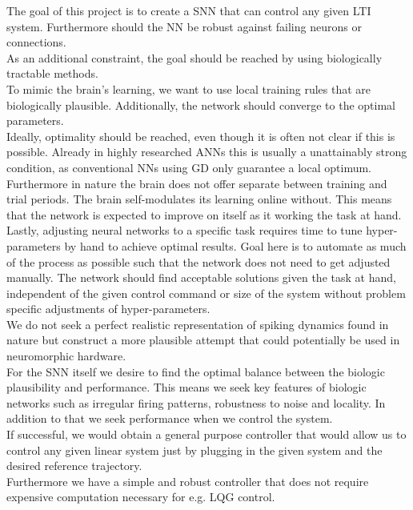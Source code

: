 The goal of this project is to create a \ac{SNN} that can control any given \ac{LTI} system. Furthermore should the \ac{NN} be robust against failing neurons or connections.\\
As an additional constraint, the goal should be reached by using biologically tractable methods.\\
To mimic the brain's learning, we want to use local training rules that are biologically plausible. Additionally, the network should converge to the optimal parameters.\\
Ideally, optimality should be reached, even though it is often not clear if this is possible. Already in highly researched \acp{ANN} this is usually a unattainably strong condition, as conventional \acp{NN} using \ac{GD} only guarantee a local optimum. \\
Furthermore in nature the brain does not offer separate between training and trial periods. The brain self-modulates its learning online without. This means that the network is expected to improve on itself as it working the task at hand.
Lastly, adjusting neural networks to a specific task requires time to tune hyper-parameters by hand to achieve optimal results. Goal here is to automate as much of the process as possible such that the network does not need to get adjusted manually. The network should find acceptable solutions given the task at hand, independent of the given control command or size of the system without problem specific adjustments of hyper-parameters.\\
We do not seek a perfect realistic representation of spiking dynamics found in nature but construct a more plausible attempt that could potentially be used in neuromorphic hardware.\\
For the \ac{SNN} itself we desire to find the optimal balance between the biologic plausibility and performance. This means we seek key features of biologic networks such as irregular firing patterns, robustness to noise and locality. In addition to that we seek performance when we control the system.\\
If successful, we would obtain a general purpose controller that would allow us to control any given linear system just by plugging in the given system and the desired reference trajectory.\\
Furthermore we have a simple and robust controller that does not require expensive computation necessary for e.g. LQG control.

